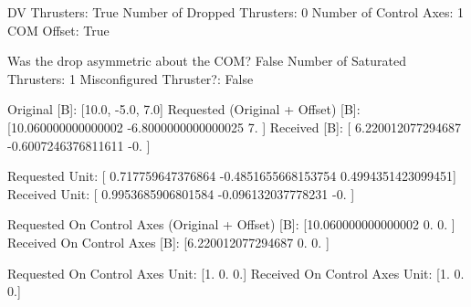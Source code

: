 DV Thrusters:	True
Number of Dropped Thrusters:	0
Number of Control Axes:	1
COM Offset:	True

Was the drop asymmetric about the COM?	False
Number of Saturated Thrusters:	1
Misconfigured Thruster?:	False

Original [B]:	[10.0, -5.0, 7.0]
Requested (Original + Offset) [B]:	[10.060000000000002  -6.8000000000000025  7.                ]
Received [B]:		[ 6.220012077294687  -0.6007246376811611 -0.                ]

Requested Unit:		[ 0.717759647376864  -0.4851655668153754  0.4994351423099451]
Received Unit:		[ 0.9953685906801584 -0.096132037778231  -0.                ]

Requested On Control Axes (Original + Offset) [B]:	[10.060000000000002  0.                 0.               ]
Received On Control Axes [B]:		[6.220012077294687 0.                0.               ]

Requested On Control Axes Unit:		[1. 0. 0.]
Received On Control Axes Unit:		[1. 0. 0.]

